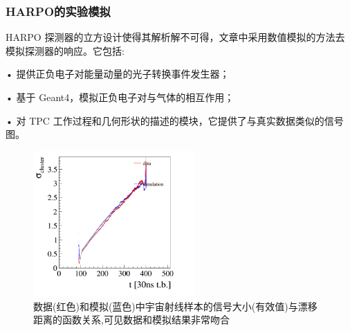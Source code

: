 \subsubsection{HARPO的实验模拟}
HARPO 探测器的立方设计使得其解析解不可得，文章中采用数值模拟的方法去模拟探测器的响应。它包括:\par
• 提供正负电子对能量动量的光子转换事件发生器；\par
• 基于 Geant4，模拟正负电子对与气体的相互作用；\par
• 对 TPC 工作过程和几何形状的描述的模块，它提供了与真实数据类似的信号图。
\begin{figure}[H] %
	\centering %
	\includegraphics[width=0.55\textwidth]{Figures/校正漂移信号结果.png} %
	\caption{数据(红色)和模拟(蓝色)中宇宙射线样本的信号大小(有效值)与漂移距离的函数关系,可见数据和模拟结果非常吻合} %
\end{figure}

